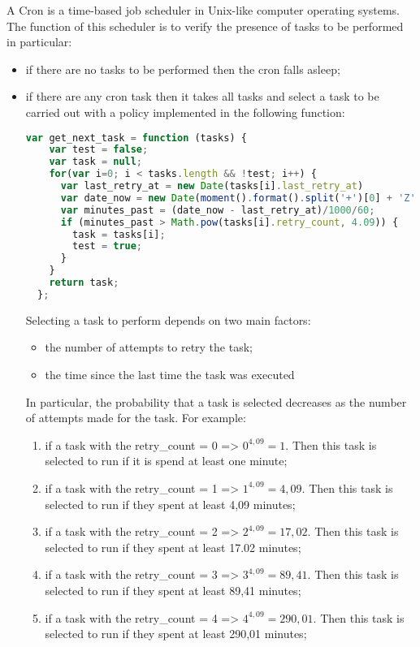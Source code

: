 A Cron is a time-based job scheduler in Unix-like computer operating systems.
The function of this scheduler is to verify the presence of tasks to be performed in particular:
\begin{itemize}
\item if there are no tasks to be performed then the cron falls asleep;
\item if there are any cron task then it takes all tasks and select a task to be carried out with a policy implemented in the following function:
\begin{lstlisting}[language=javascript]
  var get_next_task = function (tasks) {
    var test = false;
    var task = null;
    for(var i=0; i < tasks.length && !test; i++) {
      var last_retry_at = new Date(tasks[i].last_retry_at)
      var date_now = new Date(moment().format().split('+')[0] + 'Z');
      var minutes_past = (date_now - last_retry_at)/1000/60;
      if (minutes_past > Math.pow(tasks[i].retry_count, 4.09)) {
        task = tasks[i];
        test = true;
      }
    }
    return task;
  };
\end{lstlisting}
Selecting a task to perform depends on two main factors:\begin{itemize}
\item the number of attempts to retry the task;
\item the time since the last time the task was executed
\end{itemize}
In particular, the probability that a task is selected decreases as the number of attempts made for the task.
For example:
\begin{enumerate}
\item if a task with the retry\_count = 0 => \(0^{4,09} = 1\). Then this task is selected to run if it is spend at least one minute;
\item if a task with the retry\_count = 1 => \(1^{4,09} = 4,09\). Then this task is selected to run if they spent at least 4,09 minutes;
\item if a task with the retry\_count = 2 => \(2^{4,09} = 17,02\). Then this task is selected to run if they spent at least 17.02 minutes;
\item if a task with the retry\_count = 3 => \(3^{4,09} = 89,41\). Then this task is selected to run if they spent at least 89,41 minutes;
\item if a task with the retry\_count = 4 => \(4^{4,09} = 290,01\). Then this task is selected to run if they spent at least 290,01 minutes;
\end{enumerate}

\end{itemize}
